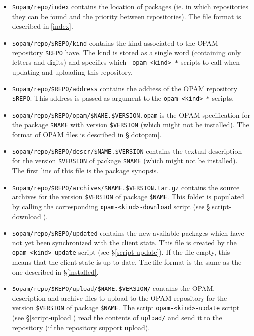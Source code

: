 \documentclass[a4paper,11pt]{article}
\begin{document}
\begin{itemize}

\item \verb+$opam/repo/index+ contains the location of packages
  (ie. in which repositories they can be found and the priority
  between repositories). The file format is described in
  \ref{index}.

\item \verb+$opam/repo/$REPO/kind+ contains the kind associated to the
  OPAM repository \verb+$REPO+ have. The kind is stored as a single
  word (containing only letters and digits) and specifies which {\tt
    opam-<kind>-*} scripts to call when updating and uploading this
  repository.

\item \verb+$opam/repo/$REPO/address+ contains the address of the
  OPAM repository \verb+$REPO+. This address is passed as argument to
  the {\tt opam-<kind>-*} scripts.

\item \verb+$opam/repo/$REPO/opam/$NAME.$VERSION.opam+ is the OPAM
  specification for the package \verb+$NAME+ with version
  \verb+$VERSION+ (which might not be installed). The format of OPAM
  files is described in \S\ref{dotopam}.

\item \verb+$opam/repo/$REPO/descr/$NAME.$VERSION+ contains the textual
  description for the version \verb+$VERSION+ of package \verb+$NAME+
  (which might not be installed). The first line of this file is the
  package synopsis.

\item \verb+$opam/repo/$REPO/archives/$NAME.$VERSION.tar.gz+ contains
  the source archives for the version \verb+$VERSION+ of package
  \verb+$NAME+. This folder is populated by calling the corresponding
  {\tt opam-<kind>-download} script (see \S\ref{script-download}).

\item \verb+$opam/repo/$REPO/updated+ contains the new available
  packages which have not yet been synchronized with the client
  state. This file is created by the {\tt opam-<kind>-update} script
  (see \S\ref{script-update}). If the file empty, this means that the
  client state is up-to-date. The file format is the same as the one
  described in \S\ref{installed}.

\item \verb+$opam/repo/$REPO/upload/$NAME.$VERSION/+ contains the
  OPAM, description and archive files to upload to the OPAM repository
  for the version \verb+$VERSION+ of package \verb+$NAME+. The script
  {\tt opam-<kind>-update} script (see \S\ref{script-upload}) read the
  contents of {\tt upload/} and send it to the repository (if the
  repository support upload).

\end{itemize}
\end{document}
